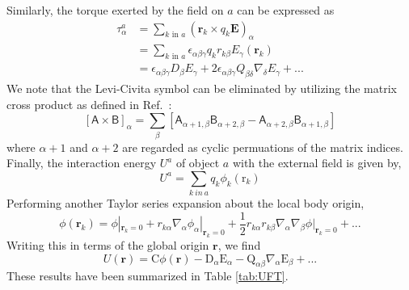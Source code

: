 Similarly, the torque exerted by the field on $a$ can be expressed as
\begin{align}
\tau^a_\alpha &=  \sum_{k \textrm{~in~} a} (\mathbf r_k \times q_k \mathbf E)_\alpha \\
 & =  \sum_{k \textrm{~in~} a} \epsilon_{\alpha \beta \gamma} q_k
 r_{k\beta} E_\gamma(\mathbf r_k) \\
 & = \epsilon_{\alpha \beta \gamma} D_\beta E_\gamma 
+ 2 \epsilon_{\alpha \beta \gamma} Q_{\beta \delta} \nabla_\delta
E_\gamma + ...
\end{align}
We note that the Levi-Civita symbol can be eliminated by utilizing the matrix cross product as defined in Ref.~\cite{Smith98}:
\begin{equation}
\left[\mathsf{A} \times \mathsf{B}\right]_\alpha = \sum_\beta
\left[\mathsf{A}_{\alpha+1,\beta} \mathsf{B}_{\alpha+2,\beta}
  -\mathsf{A}_{\alpha+2,\beta} \mathsf{B}_{\alpha+1,\beta} 
\right]
\label{eq:matrixCross}
\end{equation}
where $\alpha+1$ and $\alpha+2$ are regarded as cyclic permuations of
the matrix indices. Finally, the interaction energy $U^a$ of object $a$ with the external field is given by,
\begin{equation}
U^a = \sum_{k~in~a} q_k \phi_k (\mathrm{r}_k)
\end{equation}
Performing another Taylor series expansion about the local body origin,
\begin{equation}
\phi({\mathbf{r}_k}) = \phi|_{\mathbf{r}_k = 0 } + r_{k \alpha} \nabla_\alpha \phi_\alpha|_{\mathbf{r}_k = 0 } + \frac{1}{2} r_{k\alpha}r_{k\beta}\nabla_\alpha \nabla_\beta \phi|_{\mathbf{r}_k = 0} + ...
\end{equation}
Writing this in terms of the global origin $\mathbf{r}$, we find
\begin{equation}
U(\mathbf{r}) = \mathrm{C} \phi(\mathbf{r}) - \mathrm{D}_\alpha \mathrm{E}_\alpha - \mathrm{Q}_{\alpha\beta}\nabla_\alpha \mathrm{E}_\beta + ...
\end{equation}
These results have been summarized in Table \ref{tab:UFT}.


